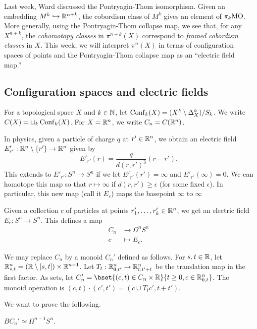 \documentclass{article}
\begin{document}
Last week, Ward discussed the Pontryagin-Thom isomorphism.
Given an embedding $M^k \hookrightarrow \mathbb{R}^{n+k}$, the cobordism class of $M^k$ gives an element of $\pi_k \mathrm{MO}$.
More generally, using the Pontryagin-Thom collapse map, we see that, for any $X^{n+k}$, the \emph{cohomotopy classes} in $\pi^{n+k}(X)$ correspond to \emph{framed cobordism classes} in $X$.
This week, we will interpret $\pi^n(X)$ in terms of configuration spaces of points and the Pontryagin-Thom collapse map as an ``electric field map.''

\subsection{Configuration spaces and electric fields}

\begin{dfn}
	For a topological space $X$ and $k \in \mathbb{N}$, let $\operatorname{Conf}_k(X) = (X^k \setminus \Delta^k_X) / S_k$.
	We write $C(X) = \sqcup_k \operatorname{Conf}_k(X)$.
	For $X = \mathbb{R}^n$, we write $C_n = C(\mathbb{R}^n)$.
\end{dfn}

In physics, given a particle of charge $q$ at $r' \in \mathbb{R}^n$, we obtain an electric field $E'_{r'}: \mathbb{R}^n \setminus \{r'\} \to \mathbb{R}^n$ given by
\[
	E'_{r'}(r) = \frac{q}{d(r, r')^3} (r - r').
\]
This extends to $E'_{r'}: S^n \to S^n$ if we let $E'_{r'}(r') = \infty$ and $E'_{r'}(\infty) = 0$.
We can homotope this map so that $r \mapsto \infty$ if $d(r, r') \geq \epsilon$ (for some fixed $\epsilon$).
In particular, this new map (call it $E_r$) maps the basepoint $\infty$ to $\infty$

Given a collection $c$ of particles at points $r'_1, \dots, r'_k \in \mathbb{R}^n$, we get an electric field $E_c: S^n \to S^n$.
This defines a map
\begin{align*}
	C_n &\to \Omega^n S^n \\
	c &\mapsto E_c.
\end{align*}

We may replace $C_n$ by a monoid $C_n'$ defined as follows.
For $s, t \in \mathbb{R}$, let $\mathbb{R}^n_{s,t} = (\mathbb{R} \setminus [s, t]) \times \mathbb{R}^{n-1}$.
Let $T_t: \mathbb{R}^n_{0,t'} \to \mathbb{R}^n_{t,t'+t}$ be the translation map in the first factor.
As sets, let $C_n' = \bset{(c, t) \in C_n \times \RR}{t \geq 0, c \in \RR^n_{0,t}}$.
The monoid operation is $(c, t) \cdot (c', t') = (c \cup T_t c', t + t')$.

We want to prove the following.

\begin{thm}
	$B C_n' \simeq \Omega^{n-1} S^n$.
\end{thm}
\end{document}

